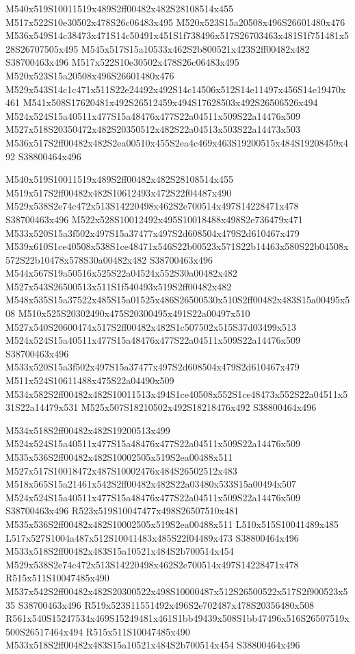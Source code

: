 \documentclass{article}
\begin{document}
\begin{multicols}{2}

M540x519S10011519x489S2ff00482x482S28108514x455 M517x522S10e30502x478S26c06483x495 M520x523S15a20508x496S26601480x476 M536x549S14c38473x471S14c50491x451S1f738496x517S26703463x481S1f751481x528S26707505x495 M545x517S15a10533x462S2b800521x423S2ff00482x482 S38700463x496 M517x522S10e30502x478S26c06483x495 M520x523S15a20508x496S26601480x476 M529x543S14c1c471x511S22e24492x492S14c14506x512S14e11497x456S14e19470x461 M541x508S17620481x492S26512459x494S17628503x492S26506526x494 M524x524S15a40511x477S15a48476x477S22a04511x509S22a14476x509 M527x518S20350472x482S20350512x482S22a04513x503S22a14473x503 M536x517S2ff00482x482S2ea00510x455S2ea4c469x463S19200515x484S19208459x492 S38800464x496

M540x519S10011519x489S2ff00482x482S28108514x455 M519x517S2ff00482x482S10612493x472S22f04487x490 M529x538S2e74c472x513S14220498x462S2e700514x497S14228471x478 S38700463x496 M522x528S10012492x495S10018488x498S2e736479x471 M533x520S15a3f502x497S15a37477x497S2d608504x479S2d610467x479 M539x610S1ce40508x538S1ce48471x546S22b00523x571S22b14463x580S22b04508x572S22b10478x578S30a00482x482 S38700463x496 M544x567S19a50516x525S22a04524x552S30a00482x482 M527x543S26500513x511S1f540493x519S2ff00482x482 M548x535S15a37522x485S15a01525x486S26500530x510S2ff00482x483S15a00495x508 M510x525S20302490x475S20300495x491S22a00497x510 M527x540S20600474x517S2ff00482x482S1c507502x515S37d03499x513 M524x524S15a40511x477S15a48476x477S22a04511x509S22a14476x509 S38700463x496 M533x520S15a3f502x497S15a37477x497S2d608504x479S2d610467x479 M511x524S10611488x475S22a04490x509 M534x582S2ff00482x482S10011513x494S1ce40508x552S1ce48473x552S22a04511x531S22a14479x531 M525x507S18210502x492S18218476x492 S38800464x496

M534x518S2ff00482x482S19200513x499 M524x524S15a40511x477S15a48476x477S22a04511x509S22a14476x509 M535x536S2ff00482x482S10002505x519S2ea00488x511 M527x517S10018472x487S10002476x484S26502512x483 M518x565S15a21461x542S2ff00482x482S22a03480x533S15a00494x507 M524x524S15a40511x477S15a48476x477S22a04511x509S22a14476x509 S38700463x496 R523x519S10047477x498S26507510x481 M535x536S2ff00482x482S10002505x519S2ea00488x511 L510x515S10041489x485 L517x527S1004a487x512S10041483x485S22f04489x473 S38800464x496 M533x518S2ff00482x483S15a10521x484S2b700514x454 M529x538S2e74c472x513S14220498x462S2e700514x497S14228471x478 R515x511S10047485x490 M537x542S2ff00482x482S20300522x498S10000487x512S26500522x517S2f900523x535 S38700463x496 R519x523S11551492x496S2e702487x478S20356480x508 R561x540S15247534x469S15249481x461S1bb49439x508S1bb47496x516S26507519x500S26517464x494 R515x511S10047485x490 M533x518S2ff00482x483S15a10521x484S2b700514x454 S38800464x496


\end{multicols}
\end{document}
